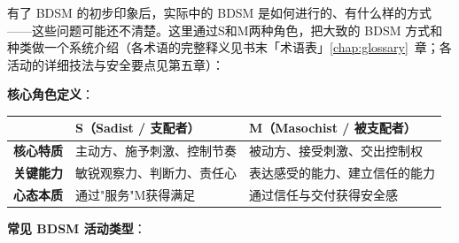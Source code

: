\documentclass[12pt,UTF8]{ctexbook}
\begin{document}
有了 BDSM 的初步印象后，实际中的 BDSM 是如何进行的、有什么样的方式——这些问题可能还不清楚。这里通过S和M两种角色，把大致的 BDSM 方式和种类做一个系统介绍（各术语的完整释义见书末「术语表」\ref{chap:glossary}~章；各活动的详细技法与安全要点见第五章）：

\noindent\textbf{核心角色定义}：

\begin{center}
\begin{tabular}{|p{3cm}|p{5.5cm}|p{5.5cm}|}
\hline
 & \textbf{S（Sadist / 支配者）} & \textbf{M（Masochist / 被支配者）} \\
\hline
\textbf{核心特质} &
主动方、施予刺激、控制节奏 &
被动方、接受刺激、交出控制权 \\
\hline
\textbf{关键能力} &
敏锐观察力、判断力、责任心 &
表达感受的能力、建立信任的能力 \\
\hline
\textbf{心态本质} &
通过"服务"M获得满足 &
通过信任与交付获得安全感 \\
\hline
\end{tabular}
\end{center}

\noindent\textbf{常见 BDSM 活动类型}：
\end{document}
